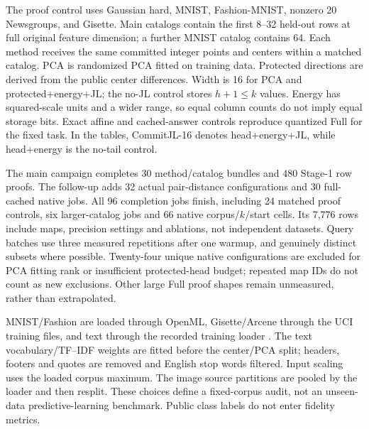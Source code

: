The proof control uses Gaussian hard, MNIST, Fashion-MNIST, nonzero 20 Newsgroups, and Gisette. Main catalogs contain the first 8--32 held-out rows at full original feature dimension; a further MNIST catalog contains 64. Each method receives the same committed integer points and centers within a matched catalog. PCA is randomized PCA fitted on training data. Protected directions are derived from the public center differences. Width is 16 for PCA and protected+energy+JL; the no-JL control stores $h+1\leq k$ values. Energy has squared-scale units and a wider range, so equal column counts do not imply equal storage bits. Exact affine and cached-answer controls reproduce quantized Full for the fixed task. In the tables, CommitJL-16 denotes head+energy+JL, while head+energy is the no-tail control.

The main campaign completes 30 method/catalog bundles and 480 Stage-1 row proofs. The follow-up adds 32 actual pair-distance configurations and 30 full-cached native jobs. All 96 completion jobs finish, including 24 matched proof controls, six larger-catalog jobs and 66 native corpus/$k$/start cells. Its 7,776 rows include maps, precision settings and ablations, not independent datasets. Query batches use three measured repetitions after one warmup, and genuinely distinct subsets where possible. Twenty-four unique native configurations are excluded for PCA fitting rank or insufficient protected-head budget; repeated map IDs do not count as new exclusions. Other large Full proof shapes remain unmeasured, rather than extrapolated.

MNIST/Fashion are loaded through OpenML, Gisette/Arcene through the UCI training files, and text through the recorded training loader \cite{lecun1998,fashion2017,gisette2004,arcene2004,news20data}. The text vocabulary/TF--IDF weights are fitted before the center/PCA split; headers, footers and quotes are removed and English stop words filtered. Input scaling uses the loaded corpus maximum. The image source partitions are pooled by the loader and then resplit. These choices define a fixed-corpus audit, not an unseen-data predictive-learning benchmark. Public class labels do not enter fidelity metrics.

